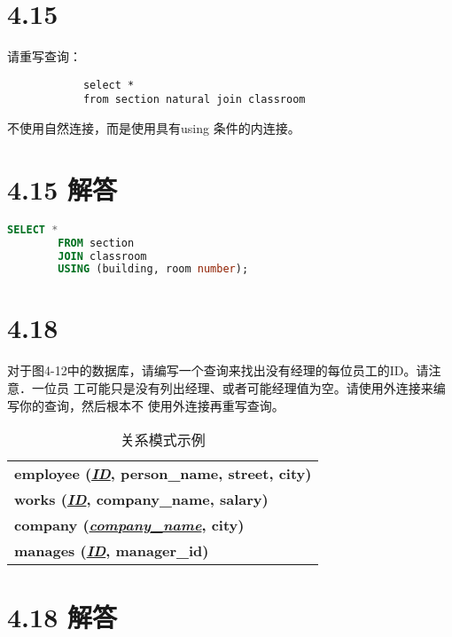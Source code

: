 \documentclass{article}
\begin{document}
	\section*{4.15}
	
	请重写查询：
	
	\begin{verbatim}
			select *
			from section natural join classroom
	\end{verbatim}
	
	不使用自然连接，而是使用具有using 条件的内连接。
	
	\section*{4.15 解答}
	
	\begin{lstlisting}[language=sql, title=4.15 解答, tabsize=2]
		SELECT *
		FROM section
		JOIN classroom
		USING (building, room number);
	\end{lstlisting}
	
	\section*{4.18}
	
	对于图4-12中的数据库，请编写一个查询来找出没有经理的每位员工的ID。请注意．一位员
	工可能只是没有列出经理、或者可能经理值为空。请使用外连接来编写你的查询，然后根本不
	使用外连接再重写查询。
	
	\begin{table}[h!]
		\centering
		\begin{tabular}{|l|}
			\hline
			\textbf{employee (\underline{\textit{ID}}, person\_name, street, city)} \\
			\textbf{works (\underline{\textit{ID}}, company\_name, salary)} \\ 
			\textbf{company (\underline{\textit{company\_name}}, city)} \\ 
			\textbf{manages (\underline{\textit{ID}}, manager\_id)} \\ \hline
		\end{tabular}
		\caption{关系模式示例}
	\end{table}
	
	\section*{4.18 解答}
	
\end{document}
